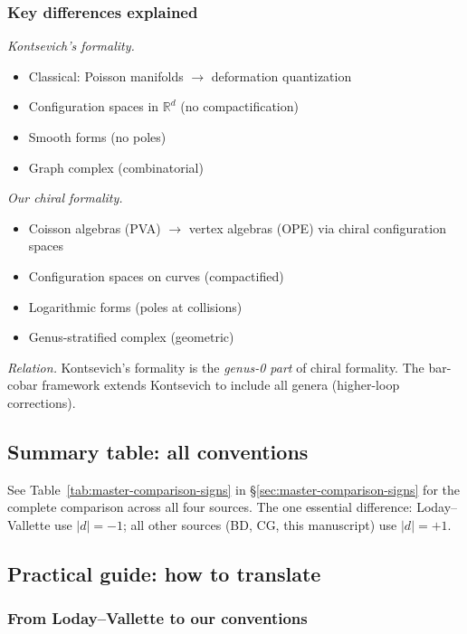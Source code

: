 \subsubsection{Key differences explained}

\emph{Kontsevich's formality.}
\begin{itemize}
\item Classical: Poisson manifolds $\to$ deformation quantization
\item Configuration spaces in $\mathbb{R}^d$ (no compactification)
\item Smooth forms (no poles)
\item Graph complex (combinatorial)
\end{itemize}

\emph{Our chiral formality.}
\begin{itemize}
\item Coisson algebras (PVA) $\to$ vertex algebras (OPE) via chiral configuration spaces
\item Configuration spaces on curves (compactified)
\item Logarithmic forms (poles at collisions)
\item Genus-stratified complex (geometric)
\end{itemize}

\emph{Relation.} Kontsevich's formality is the \emph{genus-0 part} of chiral formality. The bar-cobar framework extends Kontsevich to include all genera (higher-loop corrections).

\subsection{Summary table: all conventions}

See Table~\ref{tab:master-comparison-signs} in \S\ref{sec:master-comparison-signs} for the complete comparison across all four sources. The one essential difference: Loday--Vallette use $|d|=-1$; all other sources (BD, CG, this manuscript) use $|d|=+1$.

\subsection{Practical guide: how to translate}

\subsubsection{From Loday--Vallette to our conventions}

